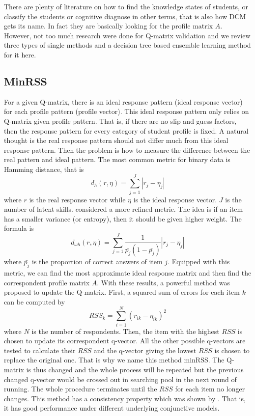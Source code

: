 \documentclass[11pt]{article}
\begin{document}
There are plenty of literature on how to find the knowledge states of students, or classify the students or cognitive diagnose in other terms, that is also how DCM gets its name. In fact they are basically looking for the profile matrix $A$. However, not too much research were done for Q-matrix validation and we review three types of single methods and a decision tree based ensemble learning method for it here. 


\subsection{MinRSS}
For a given Q-matrix, there is an ideal response pattern (ideal response vector) for each profile pattern (profile vector). This ideal response pattern only relies on Q-matrix given profile pattern. That is, if there are no slip and guess factors, then the response pattern for every category of student profile is fixed. A natural thought is the real response pattern should not differ much from this ideal response pattern. Then the problem is how to measure the difference between the real pattern and ideal pattern. The most common metric for binary data is Hamming distance, that is
$$ d_h(r,\eta)=\sum_{j=1}^{J}|r_j-\eta_j|$$
where $r$ is the real response vector while $\eta$ is the ideal response vector. $J$ is the number of latent skills. \cite{chiu2013nonparametric} considered a more refined metric. The idea is if an item has a smaller variance (or entropy), then it should be given higher weight. The formula is
$$ d_{\omega h}(r,\eta)=\sum_{j=1}^{J}\frac{1}{\bar{p_j}(1-\bar{p_j})}|r_j-\eta_j|$$
where $\bar{p_j}$ is the proportion of correct answers of item $j$. Equipped with this metric, we can find the most approximate ideal response matrix and then find the correspondent profile matrix $A$. With these results, a powerful method was proposed to update the Q-matrix\cite{chiu2013statistical}. First, a squared sum of errors for each item $k$ can be computed by
$$ RSS_k=\sum_{i=1}^{N}(r_{ik}-\eta_{ik})^2$$
where $N$ is the number of respondents. Then, the item with the highest $RSS$ is chosen to update its correspondent q-vector. All the other possible q-vectors are tested to calculate their $RSS$ and the q-vector giving the lowest $RSS$ is chosen to replace the original one. That is why we name this method minRSS. The Q-matrix is thus changed and the whole process will be repeated but the previous changed q-vector would be crossed out in searching pool in the next round of running. The whole procedure terminates until the $RSS$ for each item no longer changes.
This method has a consistency property which was shown by \cite{wang2015consistency}. That is, it has good performance under different underlying conjunctive models.
\end{document}
